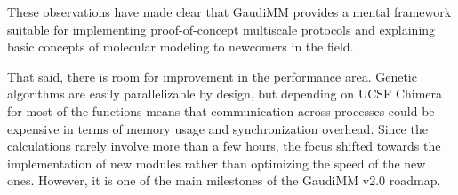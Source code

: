 These observations have made clear that GaudiMM provides a mental framework suitable for implementing proof-of-concept multiscale protocols and explaining basic concepts of molecular modeling to newcomers in the field.

That said, there is room for improvement in the performance area. Genetic algorithms are easily parallelizable by design, but depending on UCSF Chimera for most of the functions means that communication across processes could be expensive in terms of memory usage and synchronization overhead. Since the calculations rarely involve more than a few hours, the focus shifted towards the implementation of new modules rather than optimizing the speed of the new ones. However, it is one of the main milestones of the GaudiMM v2.0 roadmap.
